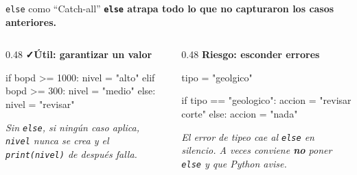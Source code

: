 \documentclass[aspectratio=169, 11pt]{beamer}
\begin{document}
\begin{frame}[fragile,shrink=12]{\texttt{else} como ``Catch-all''}
  \vspace{-4pt}
  {\small\color{arcaDark}\bfseries
    \texttt{else} atrapa \textbf{todo lo que no capturaron} los casos anteriores.}

  \vspace{4pt}
  \begin{columns}[T]
    \begin{column}{0.48\textwidth}
      {\scriptsize\color{codeGreen}\bfseries\faCheck\hspace{3pt}Útil: garantizar un valor}
      \begin{pyblock}
if bopd >= 1000:
    nivel = "alto"
elif bopd >= 300:
    nivel = "medio"
else:
    nivel = "revisar"
      \end{pyblock}
      \vspace{2pt}
      {\scriptsize\color{textMuted}\itshape
        Sin \texttt{else}, si ningún caso aplica,
        \texttt{nivel} nunca se crea y el
        \texttt{print(nivel)} de después falla.}
    \end{column}

    \begin{column}{0.48\textwidth}
      {\scriptsize\color{arcaRed}\bfseries\faExclamationTriangle\hspace{3pt}Riesgo: esconder errores}
      \begin{pyblock}
tipo = "geolgico"

if tipo == "geologico":
    accion = "revisar corte"
else:
    accion = "nada"
      \end{pyblock}
      \vspace{2pt}
      {\scriptsize\color{textMuted}\itshape
        El error de tipeo cae al \texttt{else} en
        silencio. A veces conviene \textbf{no}
        poner \texttt{else} y que Python avise.}
    \end{column}
  \end{columns}
\end{frame}
\end{document}
